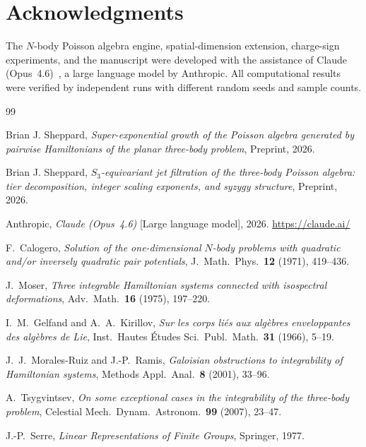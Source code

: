 \documentclass[11pt,a4paper]{article}
\theoremstyle{remark}
\begin{document}
\section*{Acknowledgments}

The $N$-body Poisson algebra engine, spatial-dimension
extension, charge-sign experiments, and the manuscript
were developed with the assistance of Claude
(Opus~4.6)~\cite{claude-2026}, a large language model by
Anthropic.  All computational results were verified by
independent runs with different random seeds and sample
counts.


\begin{thebibliography}{99}

Brian J. Sheppard,
\emph{Super-exponential growth of the Poisson algebra
generated by pairwise Hamiltonians of the planar
three-body problem},
Preprint, 2026.

Brian J. Sheppard,
\emph{$S_3$-equivariant jet filtration of the three-body
Poisson algebra: tier decomposition, integer scaling
exponents, and syzygy structure},
Preprint, 2026.

Anthropic,
\emph{Claude (Opus~4.6)} [Large language model], 2026.
\url{https://claude.ai/}

F.~Calogero,
\emph{Solution of the one-dimensional $N$-body problems
with quadratic and/or inversely quadratic pair potentials},
J.~Math.\ Phys.\ \textbf{12} (1971), 419--436.

J.~Moser,
\emph{Three integrable Hamiltonian systems connected with
isospectral deformations},
Adv.\ Math.\ \textbf{16} (1975), 197--220.

I.~M.~Gelfand and A.~A.~Kirillov,
\emph{Sur les corps li\'{e}s aux alg\`{e}bres
enveloppantes des alg\`{e}bres de Lie},
Inst.\ Hautes \'{E}tudes Sci.\ Publ.\ Math.\
\textbf{31} (1966), 5--19.

J.~J.~Morales-Ruiz and J.-P.~Ramis,
\emph{Galoisian obstructions to integrability of
Hamiltonian systems},
Methods Appl.\ Anal.\ \textbf{8} (2001), 33--96.

A.~Tsygvintsev,
\emph{On some exceptional cases in the integrability of
the three-body problem},
Celestial Mech.\ Dynam.\ Astronom.\ \textbf{99} (2007),
23--47.

J.-P.~Serre,
\emph{Linear Representations of Finite Groups},
Springer, 1977.

\end{thebibliography}
\end{document}
